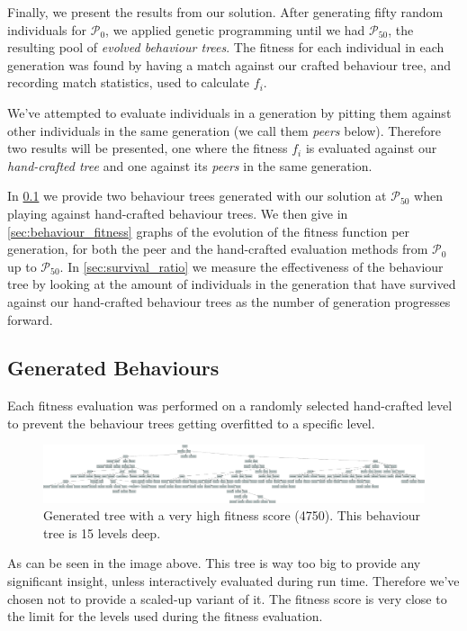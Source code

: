 \documentclass[a4paper, twocolumn]{article}
\begin{document}
        Finally, we present the results from our solution. After generating fifty random individuals for \(\mathcal{P}_0\), we applied genetic programming until we had \(\mathcal{P}_{50}\), the resulting pool of \emph{evolved behaviour trees}. The fitness for each individual in each generation was found by having a match against our crafted behaviour tree, and recording match statistics, used to calculate \(f_i\).

        We've attempted to evaluate individuals in a generation by pitting them against other individuals in the same generation (we call them \emph{peers} below). Therefore two results will be presented, one where the fitness \(f_i\) is evaluated against our \emph{hand-crafted tree} and one against its \emph{peers} in the same generation.

        In \cref{sec:generated_behaviours} we provide two behaviour trees generated with our solution at \(\mathcal{P}_{50}\) when playing against hand-crafted behaviour trees. We then give in \cref{sec:behaviour_fitness} graphs of the evolution of the fitness function per generation, for both the peer and the hand-crafted evaluation methods from \(\mathcal{P}_0\) up to \(\mathcal{P}_{50}\). In \cref{sec:survival_ratio} we measure the effectiveness of the behaviour tree by looking at the amount of individuals in the generation that have survived against our hand-crafted behaviour trees as the number of generation progresses forward.

        \subsection{Generated Behaviours} \label{sec:generated_behaviours}

        Each fitness evaluation was performed on a randomly selected hand-crafted level to prevent the behaviour trees getting overfitted to a specific level. 

        \begin{figure}[H]
            \centering
            \includegraphics[width=\linewidth]{share/tree-fitness-4750.png}
            \caption{Generated tree with a very high fitness score (4750). This behaviour tree is 15 levels deep.}
            \label{fig:tree_fitness_4075}
        \end{figure}
        As can be seen in the image above. This tree is way too big to provide any significant insight, unless interactively evaluated during run time. Therefore we've chosen not to provide a scaled-up variant of it. The fitness score is very close to the limit for the levels used during the fitness evaluation.
\end{document}
